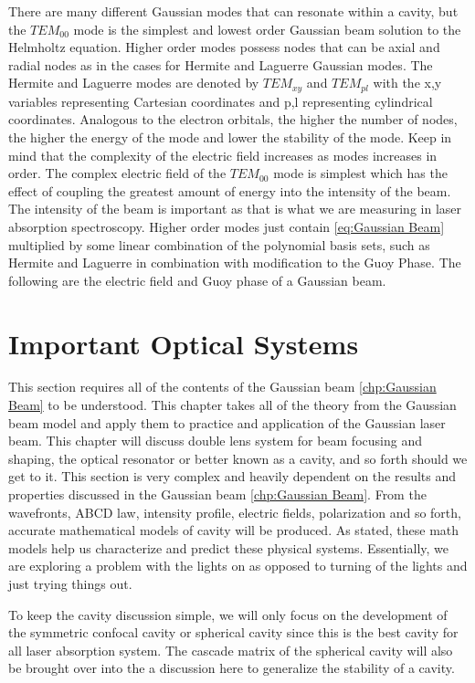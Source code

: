 \documentclass[11pt,a4paper]{book}
\begin{document}
		There are many different Gaussian modes that can resonate within a cavity, but the $TEM_{00}$ mode is the simplest and lowest order Gaussian beam solution to the Helmholtz equation. Higher order modes possess nodes that can be axial and radial nodes as in the cases for Hermite and Laguerre Gaussian modes. The Hermite and Laguerre modes are denoted by $TEM_{xy}$ and $TEM_{pl}$ with the x,y variables representing Cartesian coordinates and p,l representing cylindrical coordinates. Analogous to the electron orbitals, the higher the number of nodes, the higher the energy of the mode and lower the stability of the mode. Keep in mind that the complexity of the electric field increases as modes increases in order. The complex electric field of the $TEM_{00}$ mode is simplest which has the effect of coupling the greatest amount of energy into the intensity of the beam. The intensity of the beam is important as that is what we are measuring in laser absorption spectroscopy. Higher order modes just contain \autoref{eq:Gaussian Beam} multiplied by some linear combination of the polynomial basis sets, such as Hermite and Laguerre in combination with modification to the Guoy Phase. The following are the electric field and Guoy phase of a Gaussian beam.
\chapter{Important Optical Systems}
	\label{chp:Important Optical Systems}
	This section requires all of the contents of the Gaussian beam \autoref{chp:Gaussian Beam} to be understood. This chapter takes all of the theory from the Gaussian beam model and apply them to practice and application of the Gaussian laser beam. This chapter will discuss double lens system for beam focusing and shaping, the optical resonator or better known as a cavity, and so forth should we get to it. This section is very complex and heavily dependent on the results and properties discussed in the Gaussian beam \autoref{chp:Gaussian Beam}. From the wavefronts, ABCD law, intensity profile, electric fields, polarization and so forth, accurate mathematical models of cavity will be produced. As stated, these math models help us characterize and predict these physical systems. Essentially, we are exploring a problem with the lights on as opposed to turning of the lights and just trying things out. 
	
	To keep the cavity discussion simple, we will only focus on the development of the symmetric confocal cavity or spherical cavity since this is the best cavity for all laser absorption system. The cascade matrix of the spherical cavity will also be brought over into the a discussion here to generalize the stability of a cavity.
	
\end{document}
